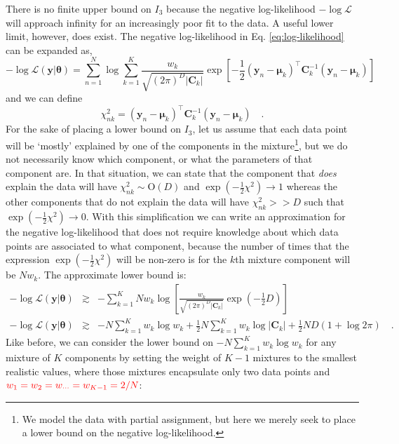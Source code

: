 \documentclass{elsarticle}
\newcommand{\todo}[1]{\textcolor{red}{#1}}
\newcommand{\vect}[1]{\boldsymbol{\mathbf{#1}}}
\renewcommand{\vec}[1]{\vect{#1}}
\def\cov{C}
\def\vecmean{\vect{\mu}}
\def\weight{w}
\def\datum{y}
\def\data{\vect{\datum}}
\def\likelihood{\mathcal{L}}
\begin{document}
There is no finite upper bound on $I_{3}$ because the negative log-likelihood
$-\log\likelihood$ will approach infinity for an increasingly poor fit to the
data. A useful lower limit, however, does exist. The negative log-likelihood
in Eq. \ref{eq:log-likelihood} can be expanded as,
\begin{equation}
    -\log\mathcal{L}\left(\vec{\data}|\vec{\theta}\right) = \sum_{n=1}^{N}\log\sum_{k=1}^{K}\frac{\weight_k}{\sqrt{(2\pi)^{D}|\vec{\cov}_k|}}\exp\left[-\frac{1}{2}\left(\vec{\data}_n - \vecmean_k\right)^\intercal{}\vec{\cov}_{k}^{-1}\left(\vec{\data}_n - \vecmean_k\right)\right]
\end{equation}
\noindent{}and we can define
\begin{equation}
\chi^{2}_{nk} = \left(\vec{\data}_{n} - \vecmean_{k}\right)^\intercal{}\vec{\cov}_{k}^{-1}\left(\vec{\data}_{n} - \vecmean_{k}\right) \quad .
\end{equation}
For the sake of placing a lower bound on $I_{3}$, let us assume that each data
point will be `mostly' explained by one of the components in the 
mixture\footnote{We model the data with partial assignment, but here we merely 
seek to place a lower bound on the negative log-likelihood.}, but we do not 
necessarily know which component, or what the parameters of that component are. 
In that situation, we can state that the component that \emph{does} explain
the data will have $\chi_{nk}^2 \sim \textrm{O}\left(D\right)$ and $\exp(-\frac{1}{2}\chi^2) \rightarrow 1$
whereas the other components that do not explain the data will have 
$\chi_{nk}^2 >> D$ such that $\exp(-\frac{1}{2}\chi^2) \rightarrow 0$. With
this simplification we can write an approximation for the negative log-likelihood
that does not require knowledge about which data points are associated to what
component, because the number of times that the expression $\exp(-\frac{1}{2}\chi^2)$
will be non-zero is for the $k$th mixture component will be $N\weight_k$. The
approximate lower bound is:
\begin{eqnarray}
    -\log\likelihood\left(\vec{\data}|\vec{\theta}\right) & \gtrsim & -\sum_{k=1}^{K}N\weight_{k}\log\left[\frac{\weight_k}{\sqrt{(2\pi)^{D}|\vec{\cov}_k|}}\exp\left(-\frac{1}{2}{D}\right)\right] \\
    -\log\likelihood\left(\vec{\data}|\vec{\theta}\right) & \gtrsim & -N\sum_{k=1}^{K}\weight_{k}\log{\weight_k} + \frac{1}{2}N\sum_{k=1}^{K}\weight_{k}\log{|\vec{\cov}_k|} + \frac{1}{2}ND\left(1 + \log{2\pi}\right) \quad . \nonumber
    \label{eq:logl-lower-bound}
\end{eqnarray}
\noindent{}Like before, we can consider the lower bound on $-N\sum_{k=1}^{K}\weight_{k}\log\weight_k$
for any mixture of $K$ components by setting the weight of $K - 1$ mixtures
to the smallest realistic values, where those mixtures encapsulate only two
data points and $\todo{w_{1} = w_2 = w_{\cdots} = w_{K-1} = 2/N}$:
\end{document}
